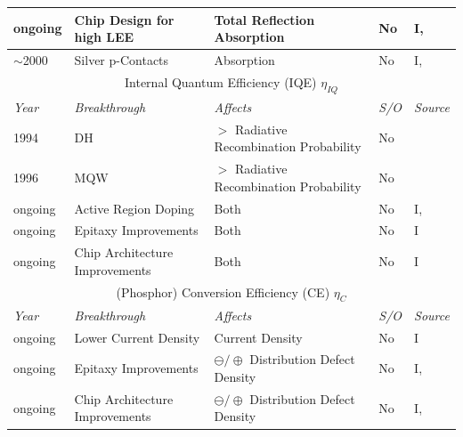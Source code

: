 \documentclass[10pt]{article}
\begin{document}
\begin{table}[H]
\begin{tabularx}{\textwidth}{ |l|X|X|l|l| }
        \hline
            ongoing & Chip Design for \newline high LEE & Total Reflection \newline Absorption & No & I, \cite{Haerle2004} \\
        \hline
            $\sim$2000 & Silver p-Contacts & Absorption & No & I, \cite{kondoh2001nitride} \\
        \hline
        \multicolumn{5}{c}{Internal Quantum Efficiency (IQE) $\eta_{IQ}$} \\
        \hline
            \textit{Year} & \textit{Breakthrough} & \textit{Affects} & \textit{S/O} & \textit{Source} \\
        \hline
            1994 & DH & $>$ Radiative Recombination \newline Probability & No & \cite{Nakamura1994} \\
        \hline
            1996 & MQW & $>$ Radiative Recombination \newline Probability & No & \cite{Koike1996} \\
        \hline
            ongoing & Active Region \newline Doping & Both & No & I, \cite{schubert2018light} \\
        \hline
            ongoing & Epitaxy \newline Improvements & Both & No & I \\
        \hline
            ongoing & Chip Architecture \newline Improvements & Both & No & I \\
        \hline
        \multicolumn{5}{c}{(Phosphor) Conversion Efficiency (CE) $\eta_{C}$} \\
        \hline
            \textit{Year} & \textit{Breakthrough} & \textit{Affects} & \textit{S/O} & \textit{Source} \\
        \hline
            ongoing & Lower Current Density & Current Density & No & I \\
        \hline
            ongoing & Epitaxy \newline Improvements & $\ominus/\oplus$ Distribution \newline Defect Density & No & I, \cite{bhardwaj2016progress} \\
        \hline
            ongoing & Chip Architecture \newline Improvements  & $\ominus/\oplus$ Distribution \newline Defect Density & No & I, \cite{Wildeson2017} \\

\end{tabularx}
\end{table}
\end{document}

